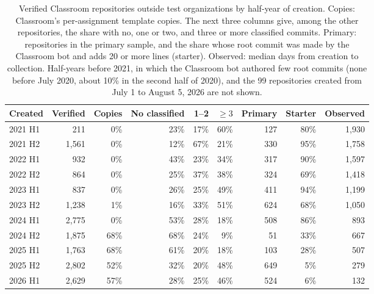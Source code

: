 \begin{table}
\caption{Verified Classroom repositories outside test organizations by half-year of creation. Copies: Classroom's per-assignment template copies. The next three columns give, among the other repositories, the share with no, one or two, and three or more classified commits. Primary: repositories in the primary sample, and the share whose root commit was made by the Classroom bot and adds 20 or more lines (starter). Observed: median days from creation to collection. Half-years before 2021, in which the Classroom bot authored few root commits (none before July 2020, about 10\% in the second half of 2020), and the 99 repositories created from July 1 to August 5, 2026 are not shown.}
\label{tab:recordgen}
\footnotesize
\setlength{\tabcolsep}{4pt}
\begin{tabular}{@{}l r r r r r r r r@{}}
\toprule
Created & Verified & Copies & No classified & 1--2 & $\geq 3$ & Primary & Starter & Observed \\
\midrule
2021 H1 & 211 & 0\% & 23\% & 17\% & 60\% & 127 & 80\% & 1,930 \\
2021 H2 & 1,561 & 0\% & 12\% & 67\% & 21\% & 330 & 95\% & 1,758 \\
2022 H1 & 932 & 0\% & 43\% & 23\% & 34\% & 317 & 90\% & 1,597 \\
2022 H2 & 864 & 0\% & 25\% & 37\% & 38\% & 324 & 69\% & 1,418 \\
2023 H1 & 837 & 0\% & 26\% & 25\% & 49\% & 411 & 94\% & 1,199 \\
2023 H2 & 1,238 & 1\% & 16\% & 33\% & 51\% & 624 & 68\% & 1,050 \\
2024 H1 & 2,775 & 0\% & 53\% & 28\% & 18\% & 508 & 86\% & 893 \\
2024 H2 & 1,875 & 68\% & 68\% & 24\% & 9\% & 51 & 33\% & 667 \\
2025 H1 & 1,763 & 68\% & 61\% & 20\% & 18\% & 103 & 28\% & 507 \\
2025 H2 & 2,802 & 52\% & 32\% & 20\% & 48\% & 649 & 5\% & 279 \\
2026 H1 & 2,629 & 57\% & 28\% & 25\% & 46\% & 524 & 6\% & 132 \\
\bottomrule
\end{tabular}
\end{table}
